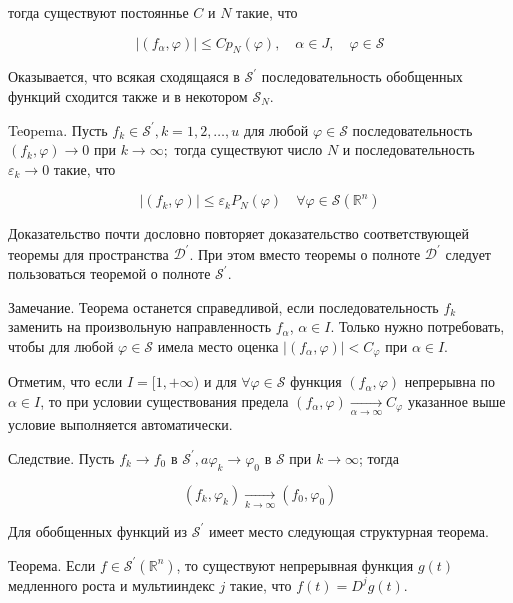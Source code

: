 тогда существуют постояннье $C$ и $N$ такие, что

$$
\left|\left(f_\alpha, \varphi\right)\right| \leqslant C p_N(\varphi), \quad \alpha \in J, \quad \varphi \in \mathcal{S}
$$


Оказывается, что всякая сходящаяся в $\mathcal{S}^{\prime}$ последовательность обобщенных функций сходится также и в некотором $\mathcal{S}_N$.

Teоpema. Пусть $f_k \in \mathcal{S}^{\prime}, k=1,2, \ldots, u$ для любой $\varphi \in \mathcal{S}$ последовательность $\left(f_k, \varphi\right) \rightarrow 0$ при $k \rightarrow \infty ;$ тогда существуют число $N$ и последовательность $\varepsilon_k \rightarrow 0$ такие, что

$$
\left|\left(f_k, \varphi\right)\right| \leqslant \varepsilon_k P_N(\varphi) \quad \forall \varphi \in \mathcal{S}\left(\mathbb{R}^n\right)
$$


Доказательство почти дословно повторяет доказательство соответствующей теоремы для пространства $\mathcal{D}^{\prime}$. При этом вместо теоремы о полноте $\mathcal{D}^{\prime}$ следует пользоваться теоремой о полноте $\mathcal{S}^{\prime}$.

Замечание. Теорема останется справедливой, если последовательность $f_k$ заменить на произвольную направленность $f_\alpha$, $\alpha \in I$. Только нужно потребовать, чтобы для любой $\varphi \in \mathcal{S}$ имела место оценка $\left|\left(f_\alpha, \varphi\right)\right|<C_{\varphi}$ при $\alpha \in I$.

Отметим, что если $I=[1,+\infty)$ и для $\forall \varphi \in \mathcal{S}$ функция $\left(f_\alpha, \varphi\right)$ непрерывна по $\alpha \in I$, то при условии существования предела $\left(f_\alpha, \varphi\right) \underset{\alpha \rightarrow \infty}{\longrightarrow} C_{\varphi}$ указанное выше условие выполняется автоматически.

Следствие. Пусть $f_k \rightarrow f_0$ в $\mathcal{S}^{\prime}, a \varphi_k \rightarrow \varphi_0$ в $\mathcal{S}$ при $k \rightarrow \infty$; тогда

$$
\left(f_k, \varphi_k\right) \underset{k \rightarrow \infty}{\longrightarrow}\left(f_0, \varphi_0\right)
$$


Для обобщенных функций из $\mathcal{S}^{\prime}$ имеет место следующая структурная теорема.

Теорема. Если $f \in \mathcal{S}^{\prime}\left(\mathbb{R}^n\right)$, то существуют непрерывная функция $g(t)$ медленного роста и мультииндекс $j$ такие, что $f(t)=D^j g(t)$.

